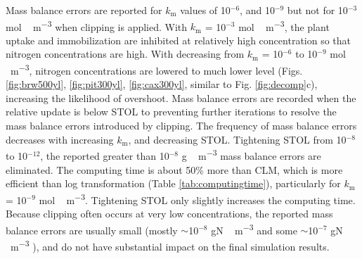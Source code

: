 \documentclass[gmd, manuscript]{copernicus}
\begin{document}
Mass balance errors are reported for $k_\text{m}$ values of 10$^{-6}$, and 10$^{-9}$ but not for 10$^{-3}$ \unit{mol\,m^{-3}} when clipping is applied. With $k_\text{m}$ = 10$^{-3}$ \unit{mol\,m^{-3}}, the plant uptake and immobilization are inhibited at relatively high concentration so that nitrogen concentrations are high. With decreasing from $k_\text{m}$ = 10$^{-6}$ to 10$^{-9}$ \unit{mol\,m^{-3}}, nitrogen concentrations are lowered to much lower level (Figs. \ref{fig:brw500yl}, \ref{fig:pit300yl}, \ref{fig:cax300yl}, similar to Fig. \ref{fig:decomp}c), increasing the likelihood of overshoot. Mass balance errors are recorded when the relative update is below STOL to preventing further iterations to
resolve the mass balance errors introduced by clipping. The frequency of
mass balance errors decreases with increasing $k_\text{m}$, and decreasing STOL. Tightening STOL from 10$^{-8}$ to 10$^{-12}$, the reported greater than 10$^{-8}$ \unit{g\,m^{-3}} mass balance errors are eliminated. The computing time is about 50\% more than CLM, which is more efficient than log transformation (Table \ref{tab:computingtime}), particularly for $k_\text{m}$ = 10$^{-9}$ \unit{mol\,m^{-3}}. Tightening STOL only slightly increases the computing time. 
Because clipping often occurs at very low concentrations, the reported mass
balance errors are usually small (mostly $\sim$10$^{-8}$  \unit{gN\,m^{-3}} and some  $\sim$10$^{-7}$  \unit{gN\,m^{-3}} ), and do not have substantial impact on the final simulation results. 
\end{document}
